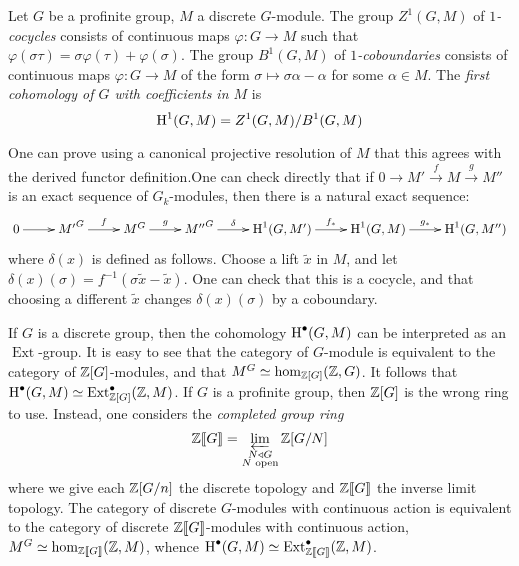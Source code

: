 \documentclass{article}
\begin{document}
\begin{definition}
Let $G$ be a profinite group, $M$ a discrete $G$-module. The group $Z^1(G,M)$ 
of \emph{$1$-cocycles} consists of continuous maps $\varphi:G\to M$ such that 
$\varphi(\sigma\tau)=\sigma\varphi(\tau)+\varphi(\sigma)$. The group $B^1(G,M)$ 
of \emph{$1$-coboundaries} consists of continuous maps $\varphi:G\to M$ of the 
form $\sigma\mapsto \sigma\alpha-\alpha$ for some $\alpha\in M$. The 
\emph{first cohomology of $G$ with coefficients in $M$} is 
\[
  \operatorname{H}^1(G,M) = Z^1(G,M) / B^1(G,M)
\]
\end{definition}
One can prove using a canonical projective resolution of $M$ that this agrees 
with the derived functor definition.One can check directly that if 
$0\to M'\xrightarrow f M\xrightarrow g M''$ is an exact sequence of 
$G_k$-modules, then there is a natural exact sequence:
\[\xymatrix{
  0 \ar[r] 
    & {M'}^G \ar[r]^-f
    & M^G \ar[r]^-g
    & {M''}^G \ar[r]^-\delta
    & \h^1(G,M') \ar[r]^-{f_*}
    & \h^1(G,M) \ar[r]^-{g_*}
    & \h^1(G,M'')
}\]
where $\delta(x)$ is defined as follows. Choose a lift $\tilde x$ in 
$M$, and let $\delta(x)(\sigma) = f^{-1}(\sigma \tilde x - \tilde x)$. One can 
check that this is a cocycle, and that choosing a different $\tilde x$ changes 
$\delta(x)(\sigma)$ by a coboundary. 

If $G$ is a discrete group, then the cohomology $\operatorname{H}^\bullet(G,M)$ can be 
interpreted as an $\operatorname{Ext}$-group. It is easy to see that the 
category of $G$-module is equivalent to the category of $\mathbb{Z}[G]$-modules, and 
that $M^G\simeq \hom_{\mathbb{Z}[G]}(\mathbb{Z},G)$. It follows that 
$\operatorname{H}^\bullet(G,M)\simeq \operatorname{Ext}_{\mathbb{Z}[G]}^\bullet(\mathbb{Z},M)$. If $G$ is a 
profinite group, then $\mathbb{Z}[G]$ is the wrong ring to use. Instead, one considers 
the \emph{completed group ring} 
\[
  \mathbb{Z}\llbracket G\rrbracket = \varprojlim_{\substack{N\triangleleft G \\ N\text{ open}}} \mathbb{Z}[G/N]
\]
where we give each $\mathbb{Z}[G/n]$ the discrete topology and 
$\mathbb{Z}\llbracket G\rrbracket$ the inverse limit topology. The category of 
discrete $G$-modules with continuous action is equivalent to the category of 
discrete $\mathbb{Z}\llbracket G\rrbracket$-modules with continuous action, 
$M^G\simeq \hom_{\mathbb{Z}\llbracket G\rrbracket}(\mathbb{Z},M)$, whence 
$\operatorname{H}^\bullet(G,M) \simeq \operatorname{Ext}_{\mathbb{Z}\llbracket G\rrbracket}^\bullet(\mathbb{Z},M)$. 
\end{document}
